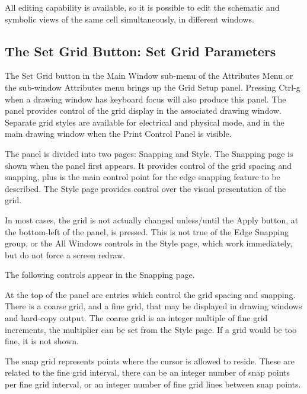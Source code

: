 All editing capability is available, so it is possible to edit the
schematic and symbolic views of the same cell simultaneously, in
different windows.


\subsection{The {\cb Set Grid} Button: Set Grid Parameters}
\label{gridpop}
The {\cb Set Grid} button in the {\cb Main Window} sub-menu of the
{\cb Attributes Menu} or the sub-window {\cb Attributes} menu brings
up the {\cb Grid Setup} panel.  Pressing {\kb Ctrl-g} when a drawing
window has keyboard focus will also produce this panel.  The panel
provides control of the grid display in the associated drawing window. 
Separate grid styles are available for electrical and physical mode,
and in the main drawing window when the {\cb Print Control Panel} is
visible.

The panel is divided into two pages:  {\cb Snapping} and {\cb Style}. 
The {\cb Snapping} page is shown when the panel first appears.  It
provides control of the grid spacing and snapping, plus is the main
control point for the edge snapping feature to be described.  The {\cb
Style} page provides control over the visual presentation of the grid.

In most cases, the grid is not actually changed unless/until the {\cb
Apply} button, at the bottom-left of the panel, is pressed.  This is
not true of the {\cb Edge Snapping} group, or the {\cb All Windows}
controls in the {\cb Style} page, which work immediately, but do not
force a screen redraw.

The following controls appear in the {\cb Snapping} page.

At the top of the panel are entries which control the grid spacing and
snapping.  There is a coarse grid, and a fine grid, that may be
displayed in drawing windows and hard-copy output.  The coarse grid is
an integer multiple of fine grid increments, the multiplier can be set
from the {\cb Style} page.  If a grid would be too fine, it is not
shown.

The snap grid represents points where the cursor is allowed to reside. 
These are related to the fine grid interval, there can be an integer
number of snap points per fine grid interval, or an integer number of
fine grid lines between snap points.


